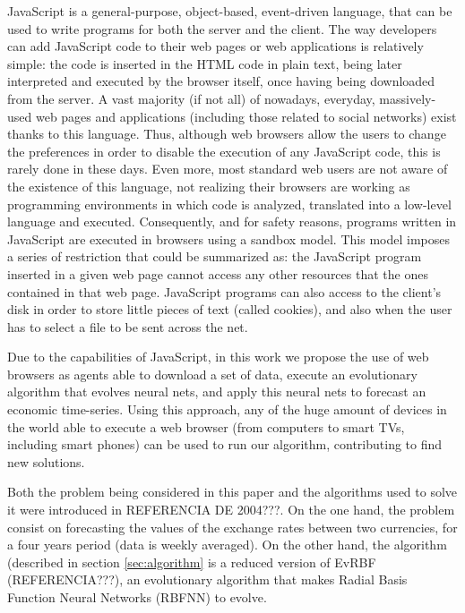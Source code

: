 \documentclass{llncs}
\begin{document}

JavaScript is a general-purpose, object-based, event-driven language, that can be used to write programs for both the server and the client.  The way developers can add JavaScript code to their web pages or web applications is relatively simple: the code is inserted in the HTML code in plain text, being later interpreted and executed by the browser itself, once having being downloaded from the server. A vast majority (if not all) of nowadays, everyday, massively-used web pages and applications (including those related to social networks) exist thanks to this language. Thus, although web browsers allow the users to change the preferences in order to disable the execution of any JavaScript code, this is rarely done in these days. Even more, most standard web users are not aware of the existence of this language, not realizing their browsers are working as programming environments in which code is analyzed, translated into a low-level language and executed. Consequently, and for safety reasons, programs written in JavaScript are executed in browsers using a sandbox model. This model imposes a series of restriction that could be summarized as: the JavaScript program inserted in a given web page cannot access any other resources that the ones contained in that web page. JavaScript programs can also access to the client's disk in order to store little pieces of text (called cookies), and also when the user has to select a file to be sent across the net. 

Due to the capabilities of JavaScript, in this work we propose the use of web browsers as agents able to download a set of data, execute an evolutionary algorithm that evolves neural nets, and apply this neural nets to forecast an economic time-series. Using this approach, any of the huge amount of devices in the world able to execute a web browser (from computers to smart TVs, including smart phones) can be used to run our algorithm, contributing to find new solutions.
 
Both the problem being considered in this paper and the algorithms used to solve it were introduced in REFERENCIA DE 2004???. On the one hand, the problem consist on forecasting the values of the 
exchange rates between two currencies, for a four years period (data is weekly averaged). On the other hand, the algorithm (described in section \ref{sec:algorithm} is a reduced version of EvRBF (REFERENCIA???), an evolutionary algorithm that makes Radial Basis Function Neural Networks (RBFNN) to evolve.
\end{document}
